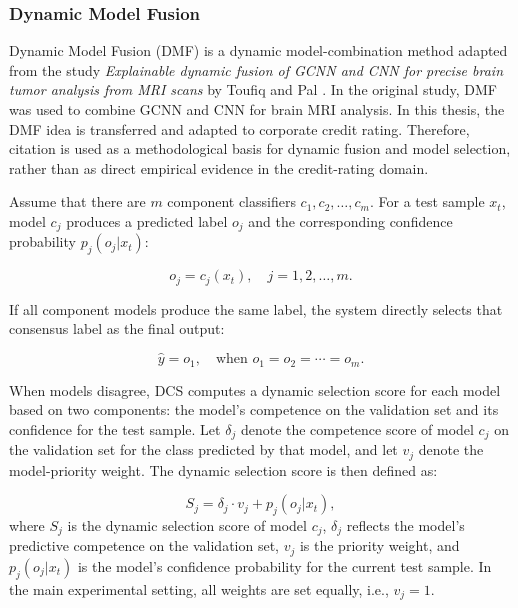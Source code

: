 \documentclass[10pt,twoside]{article}
\begin{document}
\subsubsection{Dynamic Model Fusion}

Dynamic Model Fusion (DMF) is a dynamic model-combination method adapted from the study \textit{Explainable dynamic fusion of GCNN and CNN for precise brain tumor analysis from MRI scans} by Toufiq and Pal \cite{toufiq_explainable_2026}. In the original study, DMF was used to combine GCNN and CNN for brain MRI analysis. In this thesis, the DMF idea is transferred and adapted to corporate credit rating. Therefore, citation \cite{toufiq_explainable_2026} is used as a methodological basis for dynamic fusion and model selection, rather than as direct empirical evidence in the credit-rating domain.

Assume that there are $m$ component classifiers $c_1,c_2,\ldots,c_m$. For a test sample $x_t$, model $c_j$ produces a predicted label $o_j$ and the corresponding confidence probability $p_j(o_j|x_t)$:

\begin{equation}
    o_j = c_j(x_t), \quad j=1,2,\ldots,m.
\end{equation}

If all component models produce the same label, the system directly selects that consensus label as the final output:

\begin{equation}
    \hat{y} = o_1, \quad \text{when } o_1=o_2=\cdots=o_m.
\end{equation}

When models disagree, DCS computes a dynamic selection score for each model based on two components: the model's competence on the validation set and its confidence for the test sample. Let $\delta_j$ denote the competence score of model $c_j$ on the validation set for the class predicted by that model, and let $v_j$ denote the model-priority weight. The dynamic selection score is then defined as:

\begin{equation}
    S_j = \delta_j \cdot v_j + p_j(o_j|x_t),
\end{equation}
where $S_j$ is the dynamic selection score of model $c_j$, $\delta_j$ reflects the model's predictive competence on the validation set, $v_j$ is the priority weight, and $p_j(o_j|x_t)$ is the model's confidence probability for the current test sample. In the main experimental setting, all weights are set equally, i.e., $v_j=1$.
\end{document}
